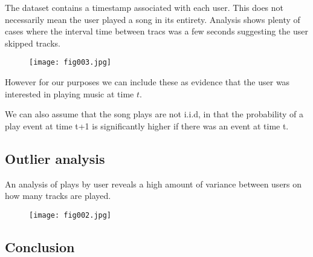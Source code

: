 The dataset contains a timestamp associated with each user. This does not necessarily mean the user played a song in its entirety. Analysis shows plenty of cases where the interval time between tracs was a few seconds suggesting the user skipped tracks.

\begin{figure}[h!]
	\centering
	\texttt{[image: fig003.jpg]}
	\caption{}
	\label{fig:fig3}
\end{figure} 

However for our purposes we can include these as evidence that the user was interested in playing music at time $t$.

We can also assume that the song plays are not i.i.d, in that the probability of a play event at time t+1 is significantly higher if there was an event at time t. 

\subsection{Outlier analysis}

An analysis of plays by user reveals a high amount of variance between users on how many tracks are played. 
\begin{figure}[h!]
	\centering
	\texttt{[image: fig002.jpg]}
	\caption{}
	\label{fig:fig2}
\end{figure} 

\subsection{Conclusion}